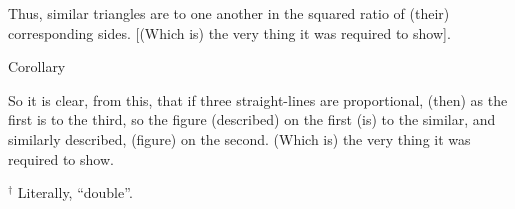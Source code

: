 \begin{Parallel}{}{}
{Thus, similar triangles are to one another in the squared
ratio of  (their) corresponding sides. [(Which is) the very thing it was required
to show].\\

\begin{center}
{\large Corollary}
\end{center}\vspace*{-7pt}

So it is clear, from this, that if three straight-lines are proportional, (then)
as the first is to the third, so  the figure (described) on the first (is) to the similar,
and similarly described, (figure) on the second. (Which is) the very thing it
was required to show.}
\end{Parallel}
{\footnotesize\noindent$^\dag$ Literally, ``double''.}

